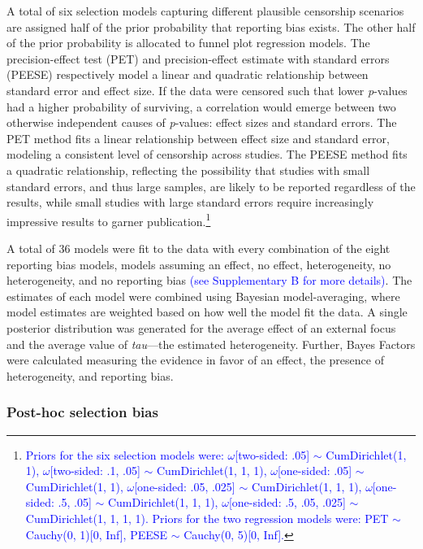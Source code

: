 \documentclass[
  man, donotrepeattitle,floatsintext]{apa7}
\begin{document}
A total of six selection models capturing different plausible censorship scenarios are assigned half of the prior probability that reporting bias exists. The other half of the prior probability is allocated to funnel plot regression models. The precision-effect test (PET) and precision-effect estimate with standard errors (PEESE) respectively model a linear and quadratic relationship between standard error and effect size. If the data were censored such that lower \emph{p}-values had a higher probability of surviving, a correlation would emerge between two otherwise independent causes of \emph{p}-values: effect sizes and standard errors. The PET method fits a linear relationship between effect size and standard error, modeling a consistent level of censorship across studies. The PEESE method fits a quadratic relationship, reflecting the possibility that studies with small standard errors, and thus large samples, are likely to be reported regardless of the results, while small studies with large standard errors require increasingly impressive results to garner publication.\footnote{\textcolor{blue}{Priors for the six selection models were: $\omega$[two-sided: .05] $\sim$ CumDirichlet(1, 1), $\omega$[two-sided: .1, .05] $\sim$ CumDirichlet(1, 1, 1), $\omega$[one-sided: .05] $\sim$ CumDirichlet(1, 1), $\omega$[one-sided: .05, .025] $\sim$ CumDirichlet(1, 1, 1), $\omega$[one-sided: .5, .05] $\sim$ CumDirichlet(1, 1, 1), $\omega$[one-sided: .5, .05, .025] $\sim$ CumDirichlet(1, 1, 1, 1). Priors for the two regression models were: PET $\sim$ Cauchy(0, 1)[0, Inf], PEESE $\sim$ Cauchy(0, 5)[0, Inf].}}

A total of 36 models were fit to the data with every combination of the eight reporting bias models, models assuming an effect, no effect, heterogeneity, no heterogeneity, and no reporting bias \textcolor{blue}{(see Supplementary B for more details)}. The estimates of each model were combined using Bayesian model-averaging, where model estimates are weighted based on how well the model fit the data. A single posterior distribution was generated for the average effect of an external focus and the average value of \emph{tau}---the estimated heterogeneity. Further, Bayes Factors were calculated measuring the evidence in favor of an effect, the presence of heterogeneity, and reporting bias.

\hypertarget{post-hoc-selection-bias}{%
\subsubsection{Post-hoc selection bias}\label{post-hoc-selection-bias}}
\end{document}
